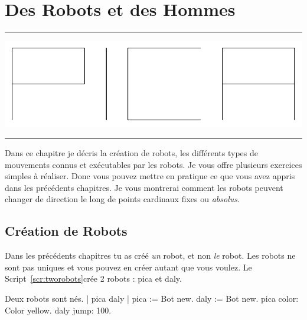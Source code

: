 \documentclass[a4paper,10pt,twoside]{book}
\begin{document}
    \sloppy
\fi

\chapter{Des Robots et des Hommes}\label{cha:robots}

\noindent\hrule
\includegraphics[width=0.9\linewidth]{turtleMPica}
\noindent\hrule\vspace{1.5cm}

Dans ce chapitre je d\'ecris la cr\'eation de robots, les diff\'erents types de mouvements connus 
et ex\'ecutables par les robots. Je vous offre plusieurs exercices simples \`a r\'ealiser. Donc vous 
pouvez mettre en pratique ce que vous avez appris dans les pr\'ec\'edents chapitres. Je vous montrerai 
comment les robots peuvent changer de direction le long de points cardinaux fixes ou \emph{absolus}.





\newpage
\section{Cr\'eation de Robots}

Dans les pr\'ec\'edents chapitres tu as cr\'e\'e \emph{un} robot, et non \emph{le} robot. Les robots ne sont pas uniques et vous 
pouvez en cr\'eer autant que vous voulez. Le Script~\ref{scr:tworobots}cr\'ee 2 robots : pica et daly.

\begin{script}[tworobots]{Deux robots sont n\'es.}
| pica daly | 
pica := Bot new. 
daly := Bot new. 
pica color: Color yellow. 
daly jump: 100. 
\end{script}
\end{document}

